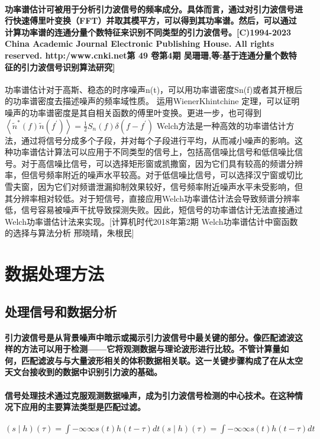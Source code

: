 \documentclass{article}
\begin{document}
\paragraph{功率谱估计可被用于分析引力波信号的频率成分。具体而言，通过对引力波信号进行快速傅里叶变换（FFT）并取其模平方，可以得到其功率谱。然后，可以通过计算功率谱的连通分量个数特征来识别不同类型的引力波信号。[C)1994-2023 China Academic Journal Electronic Publishing House. All rights reserved. http:/www.cnki.net第 49 卷第4期 吴珊珊,等:基于连通分量个数特征的引力波信号识别算法研究]}
功率谱估计对于高斯、稳态的时序噪声n(t)，可以用功率谱密度Sn(f)或者其开根后的功率谱密度去描述噪声的频率域性质。
运用WienerKhintchine 定理，可以证明噪声的功率谱密度是其自相关函数的傅里叶变换。更进一步，也可得到 
$\left\langle\tilde{n}^{*}(f) \tilde{n}\left(f^{\prime}\right)\right\rangle=\frac{1}{2} S_{n}(f) \delta\left(f-f^{\prime}\right)$
Welch方法是一种高效的功率谱估计方法，通过将信号分成多个子段，并对每个子段进行平均，从而减小噪声的影响。这种功率谱估计算法可以应用于不同类型的信号上，包括高信噪比信号和低信噪比信号。对于高信噪比信号，可以选择矩形窗或凯撒窗，因为它们具有较高的频谱分辨率，但信号频率附近的噪声水平较高。对于低信噪比信号，可以选择汉宁窗或切比雪夫窗，因为它们对频谱泄漏抑制效果较好，信号频率附近噪声水平未受影响，但其分辨率相对较低。对于短信号，直接应用Welch功率谱估计法会导致频谱分辨率低，信号容易被噪声干扰导致探测失败。因此，短信号的功率谱估计无法直接通过Welch功率谱估计法来实现。[计算机时代2018年第2期 Welch功率谱估计中窗函数的选择与算法分析 邢晓晴，朱根民]
\section{数据处理方法}
\subsection{处理信号和数据分析}
\paragraph{引力波信号是从背景噪声中暗示或揭示引力波信号中最关键的部分。像匹配滤波这样的方法可以用于检测——它将观测数据与理论波形进行比较。不管计算量如何，匹配滤波与与大量波形相关的体积数据相关联。这一关键步骤构成了在从太空天文台接收到的数据中识别引力波的基础。}
\paragraph{信号处理技术通过克服观测数据噪声，成为引力波信号检测的中心技术。在这种情况下应用的主要算法类型是匹配过滤。}
\paragraph{$(s∣ℎ)(τ)=∫−∞∞s(t)ℎ(t−τ)dt(s∣h)(τ)=∫−∞∞ s(t)h(t−τ)dt$}
\end{document}
